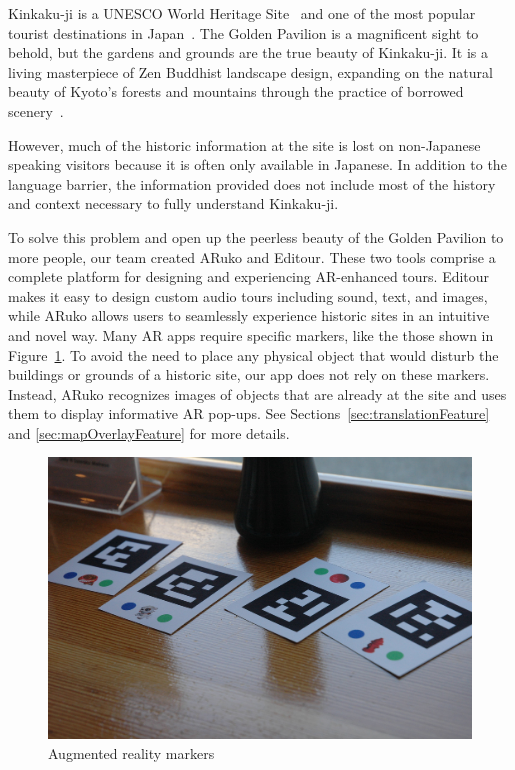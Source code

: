 \documentclass[a4paper, 10pt, american, titlepage]{article}
\begin{document}
Kinkaku-ji is a UNESCO World Heritage Site~\autocite{unesco} and one of the
most popular tourist destinations in Japan~\autocite{japanguide2019}. The
Golden Pavilion is a magnificent sight to behold, but the gardens and grounds
are the true beauty of Kinkaku-ji. It is a living masterpiece of Zen Buddhist
landscape design, expanding on the natural beauty of Kyoto's forests and
mountains through the practice of borrowed scenery~\autocite{kuitert2002}.

However, much of the historic information at the site is lost on non-Japanese
speaking visitors because it is often only available in Japanese. In addition to
the language barrier, the information provided does not include most of the
history and context necessary to fully understand Kinkaku-ji.

To solve this problem and open up the peerless beauty of the Golden Pavilion to
more people, our team created ARuko and Editour. These two tools comprise a
complete platform for designing and experiencing AR-enhanced tours. Editour
makes it easy to design custom audio tours including sound, text, and images,
while ARuko allows users to seamlessly experience historic sites in an intuitive
and novel way. Many AR apps require specific markers, like the those shown in
Figure~\ref{fig:arMarker}. To avoid the need to place any physical object that
would disturb the buildings or grounds of a historic site, our app does not rely
on these markers. Instead, ARuko recognizes images of objects that are already
at the site and uses them to display informative AR pop-ups. See
Sections~\ref{sec:translationFeature} and \ref{sec:mapOverlayFeature} for more
details.

\begin{figure}[h]
	\centering
	\includegraphics[width=\textwidth]{ar-marker.jpg}
	\caption[Augmented reality markers]{Augmented reality
		markers~\autocite{jeriaska2010}}
	\label{fig:arMarker}
\end{figure}
\end{document}
